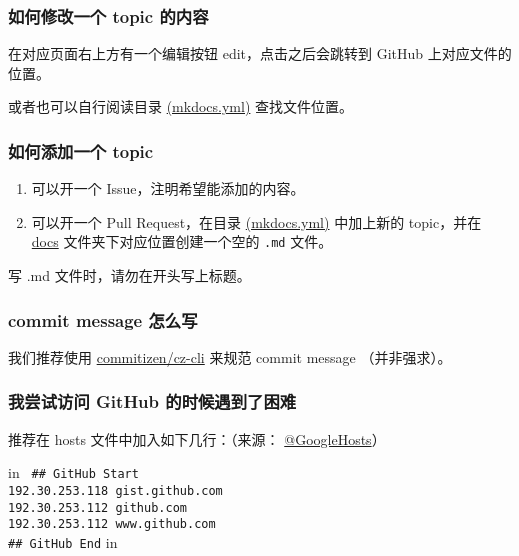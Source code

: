 \subsubsection{如何修改一个 topic 的内容}

在对应页面右上方有一个编辑按钮 edit，点击之后会跳转到 GitHub 上对应文件的位置。

或者也可以自行阅读目录 \href{https://github.com/24OI/OI-wiki/blob/master/mkdocs.yml#L17}{(mkdocs.yml)} 查找文件位置。

\subsubsection{如何添加一个 topic}

\begin{enumerate}
\item 可以开一个 Issue，注明希望能添加的内容。
\item 可以开一个 Pull Request，在目录 \href{https://github.com/24OI/OI-wiki/blob/master/mkdocs.yml#L17}{(mkdocs.yml)} 中加上新的 topic，并在 \href{https://github.com/24OI/OI-wiki/tree/master/docs}{docs} 文件夹下对应位置创建一个空的 \texttt{.md} 文件。
\end{enumerate}

\begin{NOTE}{}{}
写 .md 文件时，请勿在开头写上标题。
\end{NOTE}


\subsubsection{commit message 怎么写}

我们推荐使用 \href{https://github.com/commitizen/cz-cli}{commitizen/cz-cli} 来规范 commit message （并非强求）。

\subsubsection{我尝试访问 GitHub 的时候遇到了困难}

推荐在 hosts 文件中加入如下几行：（来源： \href{https://github.com/googlehosts/hosts/blob/master/hosts-files/hosts#L481-L485}{@GoogleHosts}）

 in
\texttt{
## GitHub Start\\192.30.253.118	gist.github.com\\192.30.253.112	github.com\\192.30.253.112	www.github.com\\## GitHub End}
 in


